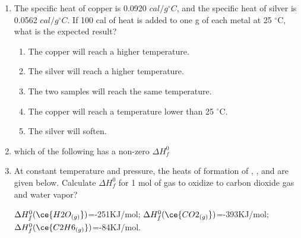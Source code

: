 \documentclass[main.tex]{subfiles}
\begin{document}
\begin{fullwidth}
\begin{multicols*}{2}
\begin{enumerate}
\item  The specific heat of copper is 0.0920 $cal/g ^{\circ}C$, and the specific heat of silver is 0.0562 $cal/g ^{\circ}C$.  If 100 cal of heat is added to one g of each metal at 25 $^{\circ}$C, what is the expected result?
\begin{enumerate}[label=(\alph*)]
\item The copper will reach a higher temperature.
\item The silver will reach a higher temperature.
\item The two samples will reach the same temperature.
\item The copper will reach a temperature lower than 25 $^{\circ}$C.
\item The silver will soften.
\end{enumerate}

\item  which of the following has a non-zero $\Delta H^0_f$
\begin{enumerate}[label=(\alph*)]\vspace{-0.5cm}
\end{enumerate}\vspace{-0.5cm}





\item  At constant temperature and pressure, the heats of formation of ,  , and   are given below. Calculate $\Delta H^0_f$ for 1 mol of  gas to oxidize to carbon dioxide gas and water vapor?
 
\begin{center}\end{center}
$\Delta H^0_f(\ce{H2O_{(g)}})$=-251KJ/mol; $\Delta H^0_f(\ce{CO2_{(g)}})$=-393KJ/mol; $\Delta H^0_f(\ce{C2H6_{(g)}})$=-84KJ/mol.
\begin{enumerate}[label=(\alph*)]\vspace{-0.5cm}
\end{enumerate}\vspace{-0.5cm}



\end{enumerate}
\end{multicols*}
\end{fullwidth}
\end{document}

